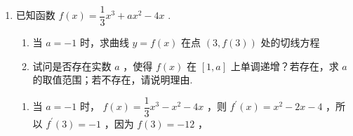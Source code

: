\begin{enumerate}
\begin{enumerate}
\begin{jieda}
\begin{enumerate}
                因为 $1 \leq  x \leq  5$ ,所以 $1 \leq  {x}^{2} \leq  {25}$ ,则 $- {25} \leq   - {x}^{2} \leq   - 1$ ,
                
                所以 $a - 2 \geq   - 1$ ，则 $a \geq  1$ .

                \item 由 (1) 得 ${f}^{\prime }\left( x\right)  = \left( {{x}^{2} + a - 2}\right) {{e}}^{x}$
                
                当 $a \geq  2$ 时， ${f}^{\prime }\left( x\right)  \geq  0$ ，则 $f\left( x\right)$ 在 $R$ 上是增函数；
                
                当 $a < 2$ 时， ${f}^{\prime }\left( x\right)  = \left\lbrack  {{x}^{2} - \left( {2 - a}\right) }\right\rbrack  {{e}}^{x} = \left( {x + \sqrt{2 - a}}\right) \left( {x - \sqrt{2 - a}}\right) {{e}}^{x}$ ,
                
                所以 ${f}^{\prime }\left( x\right)  = 0 \Longleftrightarrow  x =  \pm  \sqrt{2 - a}$ ;
                
                ${f}^{\prime }\left( x\right)  > 0 \Longleftrightarrow  x <  - \sqrt{2 - a}$ 或 $x > \sqrt{2 - a}$ ;
                
                ${f}^{\prime }\left( x\right)  < 0 \Longleftrightarrow   - \sqrt{2 - a} < x < \sqrt{2 - a},$
                
                所以 $f\left( x\right)$ 在 $\left( {-\sqrt{2 - a},\sqrt{2 - a}}\right)$ 上是减函数,在 $\left( {-\infty , - \sqrt{2 - a}}\right)$ 和 $\left( {\sqrt{2 - a}, + \infty }\right)$ 上是增函数.
            \end{enumerate}
        \end{jieda}
        \item 已知函数 $f\left( x\right)  = \dfrac{1}{3}{x}^{3} + a{x}^{2} - {4x}$ .
        \begin{enumerate}
            \item 当 $a =  - 1$ 时，求曲线 $y = f\left( x\right)$ 在点 $\left( {3,f\left( 3\right) }\right)$ 处的切线方程
            \item 试问是否存在实数 $a$ ，使得 $f\left( x\right)$ 在 $\left\lbrack  {1,a}\right\rbrack$ 上单调递增？若存在，求 $a$ 的取值范围；若不存在，请说明理由.
        \end{enumerate}
        \begin{jieda}
            \begin{enumerate}
                \item 当 $a =  - 1$ 时， $f\left( x\right)  = \dfrac{1}{3}{x}^{3} - {x}^{2} - {4x}$ ，则 ${f}^{\prime }\left( x\right)  = {x}^{2} - {2x} - 4$ ，所以 ${f}^{\prime }\left( 3\right)  =  - 1$ ，因为 $f\left( 3\right)  =  - {12}$ ，
                

\end{enumerate}
\end{jieda}
\end{enumerate}
\end{enumerate}
